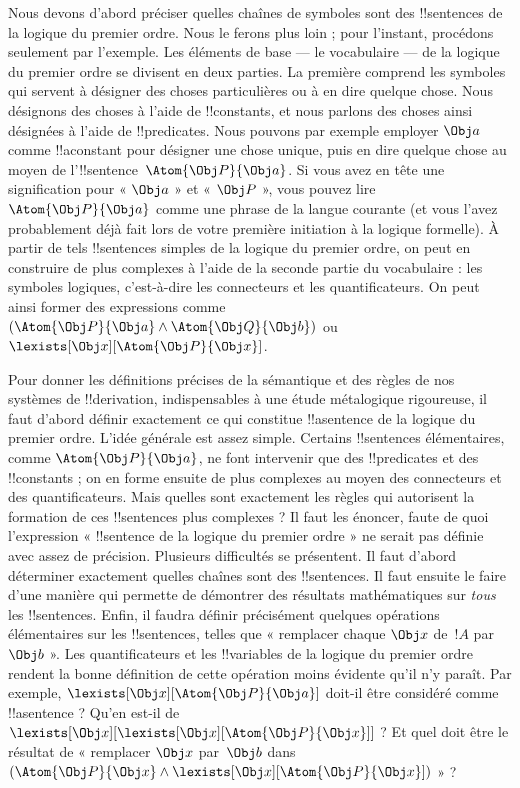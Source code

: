 \documentclass[11pt,a4paper,openany]{memoir}
\begin{document}


Nous devons d'abord préciser quelles chaînes de symboles sont des
!!{sentence}s de la logique du premier ordre. Nous le ferons plus loin ;
pour l'instant, procédons seulement par l'exemple. Les éléments de
base --- le vocabulaire --- de la logique du premier ordre se divisent
en deux parties. La première comprend les symboles qui servent à
désigner des choses particulières ou à en dire quelque chose. Nous
désignons des choses à l'aide de !!{constant}s, et nous parlons des
choses ainsi désignées à l'aide de !!{predicate}s. Nous pouvons par
exemple employer $\Obj a$ comme !!a{constant} pour désigner une chose
unique, puis en dire quelque chose au moyen de
l'!!{sentence}~$\Atom{\Obj P}{\Obj a}$. Si vous avez en tête une
signification pour « $\Obj a$ » et « $\Obj P$ », vous pouvez lire
$\Atom{\Obj P}{\Obj a}$ comme une phrase de la langue courante (et vous
l'avez probablement déjà fait lors de votre première initiation à la
logique formelle). À partir de tels !!{sentence}s simples de la logique
du premier ordre, on peut en construire de plus complexes à l'aide de
la seconde partie du vocabulaire : les symboles logiques, c'est-à-dire
les connecteurs et les quantificateurs. On peut ainsi former des
expressions comme $(\Atom{\Obj P}{\Obj a} \land
\Atom{\Obj Q}{\Obj b})$ ou~$\lexists[\Obj x][\Atom{\Obj P}{\Obj x}]$.

Pour donner les définitions précises de la sémantique et des règles de
nos systèmes de !!{derivation}, indispensables à une étude métalogique
rigoureuse, il faut d'abord définir exactement ce qui constitue
!!a{sentence} de la logique du premier ordre. L'idée générale est assez
simple. Certains !!{sentence}s élémentaires, comme
$\Atom{\Obj P}{\Obj a}$, ne font intervenir que des !!{predicate}s et
des !!{constant}s ; on en forme ensuite de plus complexes au moyen des
connecteurs et des quantificateurs. Mais quelles sont exactement les
règles qui autorisent la formation de ces !!{sentence}s plus
complexes ? Il faut les énoncer, faute de quoi l'expression
« !!{sentence} de la logique du premier ordre » ne serait pas définie
avec assez de précision. Plusieurs difficultés se présentent. Il faut
d'abord déterminer exactement quelles chaînes sont des !!{sentence}s. Il
faut ensuite le faire d'une manière qui permette de démontrer des
résultats mathématiques sur \emph{tous} les !!{sentence}s. Enfin, il
faudra définir précisément quelques opérations élémentaires sur les
!!{sentence}s, telles que « remplacer chaque $\Obj x$ de~$!A$
par~$\Obj b$ ». Les quantificateurs et les !!{variable}s de la logique
du premier ordre rendent la bonne définition de cette opération moins
évidente qu'il n'y paraît. Par exemple,
$\lexists[\Obj x][\Atom{\Obj P}{\Obj a}]$ doit-il être considéré comme
!!a{sentence} ? Qu'en est-il de
$\lexists[\Obj x][\lexists[\Obj x][\Atom{\Obj P}{\Obj x}]]$ ? Et quel
doit être le résultat de « remplacer $\Obj x$ par~$\Obj b$ dans
$(\Atom{\Obj P}{\Obj x} \land
\lexists[\Obj x][\Atom{\Obj P}{\Obj x}])$ » ?
\end{document}
